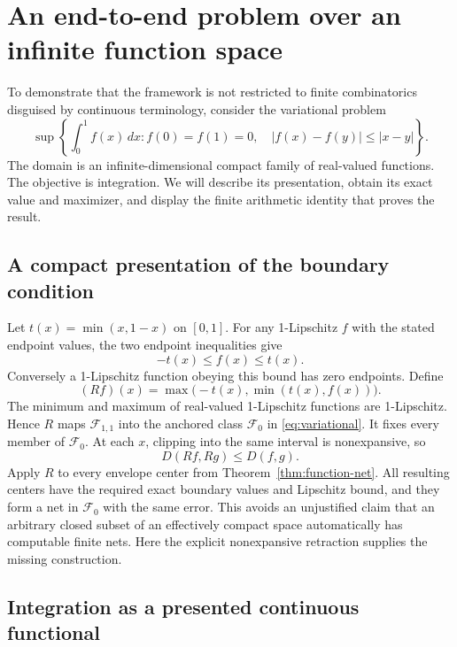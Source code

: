 \section{An end-to-end problem over an infinite function space}\label{sec:variational}

To demonstrate that the framework is not restricted to finite combinatorics disguised by continuous terminology, consider the variational problem
\begin{equation}
  \sup\left\{\int_0^1 f(x)\,dx:
  f(0)=f(1)=0,\quad |f(x)-f(y)|\leq|x-y|\right\}.
 \label{eq:variational}
\end{equation}
The domain is an infinite-dimensional compact family of real-valued functions. The objective is integration. We will describe its presentation, obtain its exact value and maximizer, and display the finite arithmetic identity that proves the result.

\subsection{A compact presentation of the boundary condition}

Let \(t(x)=\min(x,1-x)\) on \([0,1]\). For any 1-Lipschitz \(f\) with the stated endpoint values, the two endpoint inequalities give
\begin{equation}
  -t(x)\leq f(x)\leq t(x).
 \label{eq:tent-bound}
\end{equation}
Conversely a 1-Lipschitz function obeying this bound has zero endpoints. Define
\[
  (Rf)(x)=\max\bigl(-t(x),\min(t(x),f(x))\bigr).
\]
The minimum and maximum of real-valued 1-Lipschitz functions are 1-Lipschitz. Hence \(R\) maps \(\mathcal F_{1,1}\) into the anchored class \(\mathcal F_0\) in \eqref{eq:variational}. It fixes every member of \(\mathcal F_0\). At each \(x\), clipping into the same interval is nonexpansive, so
\[
 D(Rf,Rg)\leq D(f,g).
\]
Apply \(R\) to every envelope center from Theorem~\ref{thm:function-net}. All resulting centers have the required exact boundary values and Lipschitz bound, and they form a net in \(\mathcal F_0\) with the same error. This avoids an unjustified claim that an arbitrary closed subset of an effectively compact space automatically has computable finite nets. Here the explicit nonexpansive retraction supplies the missing construction.

\subsection{Integration as a presented continuous functional}

